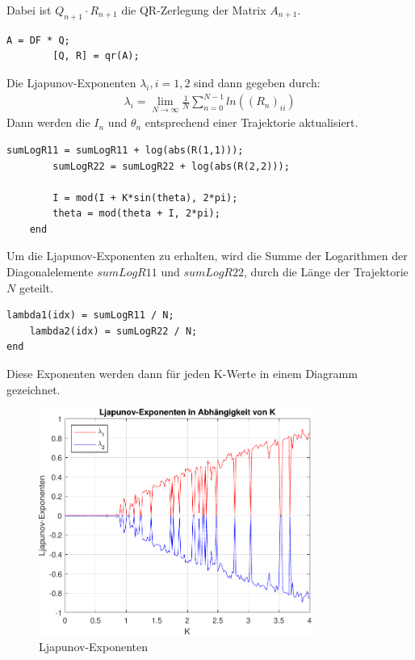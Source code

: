 \documentclass[paper=a4, 
                DIV=12]{scrartcl}
\begin{document}
Dabei ist $Q_{n+1} \cdot R_{n+1}$ die QR-Zerlegung der Matrix $A_{n+1}$.
\begin{lstlisting}[frame=single, style=Matlab-editor]
        A = DF * Q;
        [Q, R] = qr(A);
\end{lstlisting}
\newpage
\noindent Die Ljapunov-Exponenten $\lambda_i, i = 1,2$ sind dann gegeben durch:
\begin{gather*}
    \lambda_i = \lim_{N\to\infty}\frac{1}{N}\sum_{n=0}^{N-1}ln((R_n)_{ii})
\end{gather*}
Dann werden die $I_n$ und $\theta_n$ entsprechend einer Trajektorie aktualisiert.
\begin{lstlisting}[frame=single, style=Matlab-editor]
        sumLogR11 = sumLogR11 + log(abs(R(1,1)));
        sumLogR22 = sumLogR22 + log(abs(R(2,2)));

        I = mod(I + K*sin(theta), 2*pi);
        theta = mod(theta + I, 2*pi);
    end
\end{lstlisting}
Um die Ljapunov-Exponenten zu erhalten, wird die Summe der Logarithmen der Diagonalelemente $sumLogR11$ und $sumLogR22$, durch die Länge der Trajektorie $N$ geteilt. 
\begin{lstlisting}[frame=single, style=Matlab-editor]
    lambda1(idx) = sumLogR11 / N;
    lambda2(idx) = sumLogR22 / N;
end
\end{lstlisting}
Diese Exponenten werden dann für jeden K-Werte in einem Diagramm gezeichnet.
\begin{figure}[H]
    \centering
    \includegraphics[width=0.8\textwidth]{figures/exponenten.pdf}
    \caption{Ljapunov-Exponenten}
\end{figure}
\newpage
\end{document}
